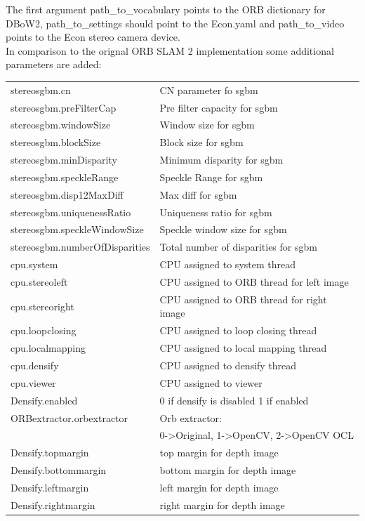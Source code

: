 \documentclass[11pt,a4paper,titlepage,oneside]{report}
\begin{document}
The first argument path\_to\_vocabulary points to the ORB dictionary for DBoW2, path\_to\_settings should point to the Econ.yaml and path\_to\_video points to the Econ stereo camera device.\\
In comparison to the orignal ORB SLAM 2 implementation some additional parameters are added:\\
\begin{tabular}{l l}
stereosgbm.cn & CN parameter fo sgbm \\
stereosgbm.preFilterCap & Pre filter capacity for sgbm \\
stereosgbm.windowSize & Window size for sgbm \\
stereosgbm.blockSize & Block size for sgbm \\
stereosgbm.minDisparity & Minimum disparity for sgbm \\
stereosgbm.speckleRange &  Speckle Range for sgbm \\
stereosgbm.disp12MaxDiff & Max diff for sgbm \\
stereosgbm.uniquenessRatio & Uniqueness ratio for sgbm \\
stereosgbm.speckleWindowSize & Speckle window size for sgbm \\
stereosgbm.numberOfDisparities & Total number of disparities for sgbm \\
cpu.system & CPU assigned to system thread \\
cpu.stereoleft & CPU assigned to ORB thread for left image \\
cpu.stereoright & CPU assigned to ORB thread for right image \\
cpu.loopclosing & CPU assigned to loop closing thread \\
cpu.localmapping & CPU assigned to local mapping thread \\
cpu.densify & CPU assigned to densify thread \\
cpu.viewer & CPU assigned to viewer \\
Densify.enabled & 0 if densify is disabled 1 if enabled \\
ORBextractor.orbextractor & Orb extractor:\\
													& 0->Original, 1->OpenCV, 2->OpenCV OCL \\
Densify.topmargin & top margin for depth image \\
Densify.bottommargin & bottom margin for depth image \\
Densify.leftmargin & left margin for depth image \\
Densify.rightmargin & right margin for depth image \\
\end{tabular}\\
\end{document}
